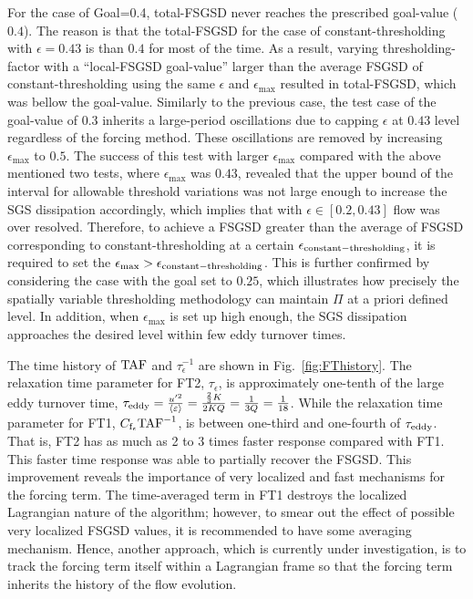 %
For the case of Goal=0.4, total-FSGSD never reaches the prescribed goal-value ($0.4$).
The reason is that the total-FSGSD for the case of constant-thresholding with $\epsilon=0.43$ is than $0.4$ for most of the time.
As a result, varying thresholding-factor with a ``local-FSGSD goal-value'' larger than the average FSGSD of constant-thresholding
using the same $\epsilon$ and $\epsilon_{\max}$ resulted in total-FSGSD, which was bellow the goal-value.
Similarly to the previous case, the test case of the goal-value of 0.3 inherits a large-period oscillations due to capping $\epsilon$ at $0.43$ level regardless of the forcing method.
These oscillations are removed by increasing $\epsilon_{\max}$ to $0.5$.
The success of this test with larger $\epsilon_{\max}$ compared with the above mentioned two tests,
where $\epsilon_{\max}$ was $0.43$,
revealed that the upper bound of the interval for allowable threshold variations
was not large enough to increase the SGS dissipation accordingly,
which implies that with $\epsilon \in [0.2,0.43]$ flow was over resolved.
Therefore, to achieve a FSGSD greater than the average of FSGSD corresponding to constant-thresholding at a certain $\epsilon_{\rm constant-thresholding}$,
it is required to set the  $\epsilon_{\max} > \epsilon_{\rm constant-thresholding}$.
This is further confirmed by considering the case with  the goal set to $0.25$, which illustrates  how precisely the spatially variable thresholding methodology can
maintain $\Pi$ at a priori defined level. In addition, when $\epsilon_{\max}$ is set up high enough,  the  SGS dissipation approaches the desired level within
few eddy turnover times.

The time history of ${\rm TAF}$ and $\tau_{\epsilon}^{-1}$ are shown in Fig.~\ref{fig:FThistory}.
The relaxation time parameter for FT2, $\tau_{\epsilon}$, is approximately one-tenth of
the large eddy turnover time,
$\tau_{\rm eddy}= \frac{u'^2}{\langle \varepsilon \rangle} = \frac{ \frac 2 3 K}{2 K Q} = \frac 1 {3Q}= \frac 1 {18}$.
While the relaxation time parameter for FT1, $C_{{\rm f}_{\epsilon}} {\rm TAF}^{-1}$, is between one-third and one-fourth of $\tau_{\rm eddy}$.
That is, FT2 has as much as 2 to 3 times faster response compared with FT1.
This faster time response was able to partially recover the FSGSD.
This improvement reveals the importance of very localized and fast mechanisms for the forcing term.
%
The time-averaged term in FT1 destroys the localized Lagrangian nature of the algorithm;
however, to smear out the effect of possible very localized FSGSD values, it is recommended to have some averaging mechanism.
Hence, another approach, which is currently under investigation,
is to track the forcing term itself within a Lagrangian frame so that
the forcing term inherits the history of the flow evolution.



